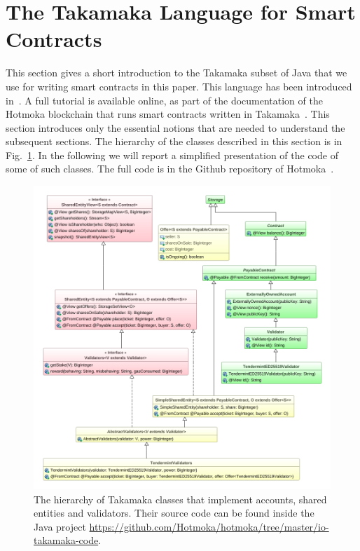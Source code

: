 \section{The Takamaka Language for Smart Contracts}\label{sec:takamaka}

This section gives a short introduction to the Takamaka subset of
Java that we use for writing smart contracts in this paper.
This language has been introduced in~\cite{Spoto19}. A full tutorial
is available online, as part of the documentation of the Hotmoka
blockchain that runs smart contracts written
in Takamaka~\cite{hotmoka_repository}. This section introduces only
the essential notions that are needed to understand the subsequent sections.
The hierarchy of the classes described in this section is in Fig.~\ref{fig:hierarchy-entities}.
In the following we will report a simplified presentation of the code of some
of such classes. The full code is in the Github repository of Hotmoka~\cite{hotmoka_repository}.

\begin{figure}[t]
  \begin{center}
    \includegraphics[width=12.2cm]{entities-hierarchy.png}
  \end{center}
  \caption{The hierarchy of Takamaka classes that implement accounts, shared entities and validators. Their source code can be found inside the Java project \textsf{\url{https://github.com/Hotmoka/hotmoka/tree/master/io-takamaka-code}}.}\label{fig:hierarchy-entities}
\end{figure}

